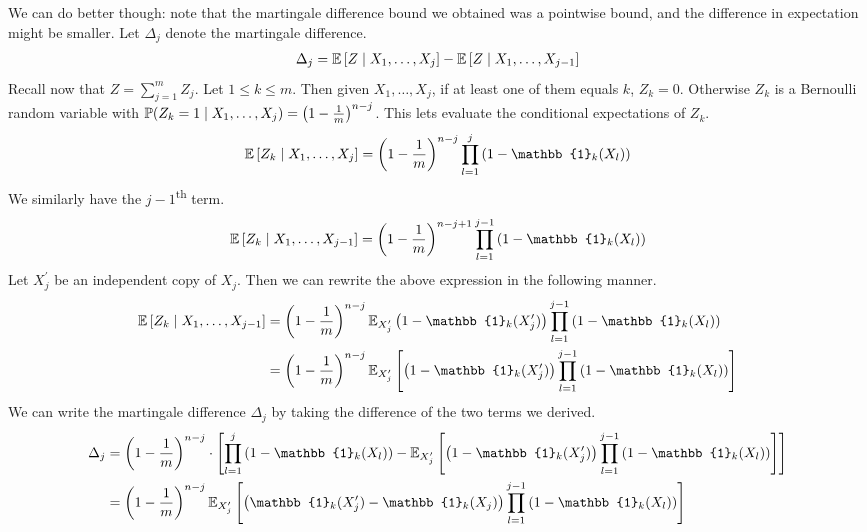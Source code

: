 \documentclass[11pt]{article}
\begin{document}
We can do better though: note that the martingale difference bound we obtained was a pointwise bound, and the difference in expectation might be smaller.
Let $\Delta_j$ denote the martingale difference.
\begin{align*}
  \Delta_j = \E\left[ Z \mid X_1, \ldots, X_j \right] - \E\left[ Z \mid X_1, \ldots, X_{j-1} \right]
\end{align*}
Recall now that $Z = \sum_{j=1}^m Z_j$. Let $1 \leq k \leq m$.
Then given $X_1, \ldots, X_j$, if at least one of them equals $k$, $Z_k = 0$.
Otherwise $Z_k$ is a Bernoulli random variable with $\P(Z_k = 1 \mid X_1, \ldots , X_j) = \left( 1- \frac{1}{m} \right)^{n-j}$.
This lets evaluate the conditional expectations of $Z_k$.
\begin{align*}
  \E\left[ Z_k \mid X_1, \ldots , X_j \right] = \left( 1 - \frac{1}{m} \right)^{n-j} \prod_{l=1}^j \left( 1 - \mathbb{1}_k(X_l) \right)
\end{align*}
We similarly have the $j-1$\textsuperscript{th} term.
\begin{align*}
  \E\left[ Z_k \mid X_1, \ldots , X_{j-1} \right] = \left( 1 - \frac{1}{m} \right)^{n-j + 1} \prod_{l=1}^{j-1} \left( 1 - \mathbb{1}_k(X_l) \right)
\end{align*}
Let $X_j^{\prime}$ be an independent copy of $X_j$. Then we can rewrite the above expression in the following manner.
\begin{align*}
  \E\left[ Z_k \mid X_1, \ldots , X_{j-1} \right]
  &= \left( 1 - \frac{1}{m} \right)^{n-j} \E_{X_{j}^{\prime}} \left( 1 - \mathbb{1}_k(X_j^{\prime}) \right) \prod_{l=1}^{j-1} \left( 1 - \mathbb{1}_k(X_l) \right) \\
  &= \left( 1 - \frac{1}{m} \right)^{n-j} \E_{X_{j}^{\prime}} \left[ \left( 1 - \mathbb{1}_k(X_j^{\prime}) \right) \prod_{l=1}^{j-1} \left( 1 - \mathbb{1}_k(X_l) \right) \right]
\end{align*}
We can write the martingale difference $\Delta_j$ by taking the difference of the two terms we derived.
\begin{align*}
  \Delta_j &= \left( 1 - \frac{1}{m} \right)^{n-j}
  \cdot \left[
  \prod_{l=1}^j \left( 1 - \mathbb{1}_k(X_l) \right) -
\E_{X_{j}^{\prime}} \left[ \left( 1 - \mathbb{1}_k(X_j^{\prime}) \right) \prod_{l=1}^{j-1} \left( 1 - \mathbb{1}_k(X_l) \right) \right]
             \right] \\
  &= \left( 1 - \frac{1}{m} \right)^{n-j} \E_{X_{j}^{\prime}} \left[ \left( \mathbb{1}_k(X_j^{\prime}) - \mathbb{1}_k(X_j) \right) \prod_{l=1}^{j-1} \left( 1 - \mathbb{1}_k(X_l) \right) \right]
\end{align*}
\end{document}
